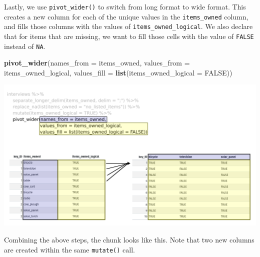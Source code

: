 \documentclass[
]{article}
\newenvironment{Shaded}{\begin{snugshade}}{\end{snugshade}}
\newcommand{\AttributeTok}[1]{\textcolor[rgb]{0.13,0.29,0.53}{#1}}
\newcommand{\ConstantTok}[1]{\textcolor[rgb]{0.56,0.35,0.01}{#1}}
\newcommand{\FunctionTok}[1]{\textcolor[rgb]{0.13,0.29,0.53}{\textbf{#1}}}
\newcommand{\NormalTok}[1]{#1}
\begin{document}
Lastly, we use \texttt{pivot\_wider()} to switch from long format to
wide format. This creates a new column for each of the unique values in
the \texttt{items\_owned} column, and fills those columns with the
values of \texttt{items\_owned\_logical}. We also declare that for items
that are missing, we want to fill those cells with the value of
\texttt{FALSE} instead of \texttt{NA}.

\begin{Shaded}
\begin{Highlighting}[]
\FunctionTok{pivot\_wider}\NormalTok{(}\AttributeTok{names\_from =}\NormalTok{ items\_owned,}
            \AttributeTok{values\_from =}\NormalTok{ items\_owned\_logical,}
            \AttributeTok{values\_fill =} \FunctionTok{list}\NormalTok{(}\AttributeTok{items\_owned\_logical =} \ConstantTok{FALSE}\NormalTok{))}
\end{Highlighting}
\end{Shaded}

\includegraphics{fig/pivot_wider.png}

Combining the above steps, the chunk looks like this. Note that two new
columns are created within the same \texttt{mutate()} call.
\end{document}
